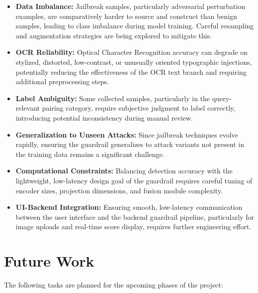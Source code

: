 \begin{itemize}

    \item \textbf{Data Imbalance:}
    Jailbreak samples, particularly adversarial perturbation examples, are
    comparatively harder to source and construct than benign samples,
    leading to class imbalance during model training. Careful resampling
    and augmentation strategies are being explored to mitigate this.

    \item \textbf{OCR Reliability:}
    Optical Character Recognition accuracy can degrade on stylized,
    distorted, low-contrast, or unusually oriented typographic injections,
    potentially reducing the effectiveness of the OCR text branch and
    requiring additional preprocessing steps.

    \item \textbf{Label Ambiguity:}
    Some collected samples, particularly in the query-relevant pairing
    category, require subjective judgment to label correctly, introducing
    potential inconsistency during manual review.

    \item \textbf{Generalization to Unseen Attacks:}
    Since jailbreak techniques evolve rapidly, ensuring the guardrail
    generalizes to attack variants not present in the training data remains
    a significant challenge.

    \item \textbf{Computational Constraints:}
    Balancing detection accuracy with the lightweight, low-latency design
    goal of the guardrail requires careful tuning of encoder sizes,
    projection dimensions, and fusion module complexity.

    \item \textbf{UI-Backend Integration:}
    Ensuring smooth, low-latency communication between the user interface
    and the backend guardrail pipeline, particularly for image uploads and
    real-time score display, requires further engineering effort.

\end{itemize}


\section{Future Work}

The following tasks are planned for the upcoming phases of the project:

